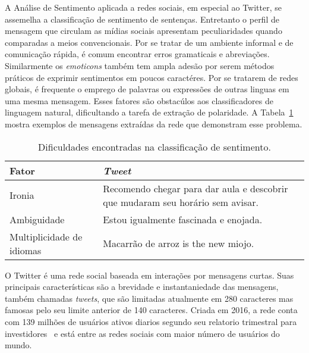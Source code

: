 A Análise de Sentimento aplicada a redes sociais, em especial ao Twitter, se
assemelha a classificação de sentimento de sentenças.
Entretanto o perfil de mensagem que circulam as mídias sociais apresentam
peculiaridades quando comparadas a meios convencionais.
Por se tratar de um ambiente informal e de comunicação rápida, é comum encontrar
erros gramaticais e abreviações.
Similarmente os \textit{emoticons} também tem ampla adesão por serem métodos
práticos de exprimir sentimentos em poucos caractéres.
Por se tratarem de redes globais, é frequente o emprego de palavras ou
expressões de outras linguas em uma mesma mensagem.
Esses fatores são obstacúlos aos classificadores de linguagem natural,
dificultando a tarefa de extração de polaridade.
A Tabela~\ref{tab:sentiment_complexity} mostra exemplos de mensagens extraídas
da rede que demonstram esse problema.

\begin{table}[h]
    \begin{center}
        \begin{tabular}{| l | p{10cm} |}
        \hline
        \textbf{Fator} & \textbf{\textit{Tweet}} \\ \hline
        Ironia & Recomendo chegar para dar aula e descobrir que mudaram seu horário sem avisar. \\ \hline
        Ambiguidade & Estou igualmente fascinada e enojada. \\ \hline
        Multiplicidade de idiomas & Macarrão de arroz is the new miojo. \\ \hline
        \end{tabular}
        \caption{Dificuldades encontradas na classificação de sentimento.}
        \label{tab:sentiment_complexity}
    \end{center}
\end{table}

O Twitter é uma rede social baseada em interações por mensagens curtas.
Suas principais características são a brevidade e instantaniedade das mensagens,
também chamadas \textit{tweets}, que são limitadas atualmente em 280 caracteres
mas famosas pelo seu limite anterior de 140 caracteres.
Criada em 2016, a rede conta com 139 milhões de usuários ativos diarios segundo
seu relatorio trimestral para investidores~\cite{twitterreport19} e está entre
as redes sociais com maior número de usuários do mundo.

